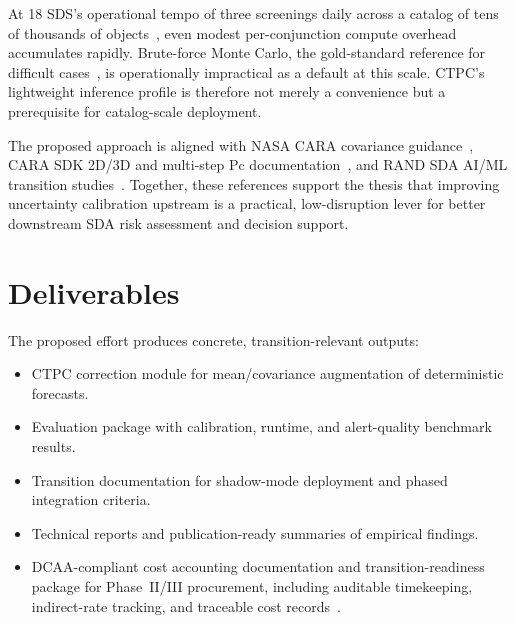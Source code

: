 \documentclass[10pt]{article}
\begin{document}
At 18 SDS's operational tempo of three screenings daily across a catalog of tens of thousands of objects~\cite{nasa_cara, ussf_18sds}, even modest per-conjunction compute overhead accumulates rapidly. Brute-force Monte Carlo, the gold-standard reference for difficult cases~\cite{hall2023_pcmultistep}, is operationally impractical as a default at this scale. CTPC's lightweight inference profile is therefore not merely a convenience but a prerequisite for catalog-scale deployment.

The proposed approach is aligned with NASA CARA covariance guidance~\cite{nasa_bestpractices, hejduk2015}, CARA SDK 2D/3D and multi-step Pc documentation~\cite{foster1992, hall2021_3dnc, hall2023_pcmultistep, cara_sdk_multistep}, and RAND SDA AI/ML transition studies~\cite{rand_rra2318_1, rand_rra2318_2}. Together, these references support the thesis that improving uncertainty calibration upstream is a practical, low-disruption lever for better downstream SDA risk assessment and decision support.


\section{Deliverables}

The proposed effort produces concrete, transition-relevant outputs:

\begin{itemize}
    \item CTPC correction module for mean/covariance augmentation of deterministic forecasts.
    \item Evaluation package with calibration, runtime, and alert-quality benchmark results.
    \item Transition documentation for shadow-mode deployment and phased integration criteria.
    \item Technical reports and publication-ready summaries of empirical findings.
    \item DCAA-compliant cost accounting documentation and transition-readiness package for Phase~II/III procurement, including auditable timekeeping, indirect-rate tracking, and traceable cost records~\cite{dcaa_sbir, dod_sbir_phase3}.
\end{itemize}



\end{document}
